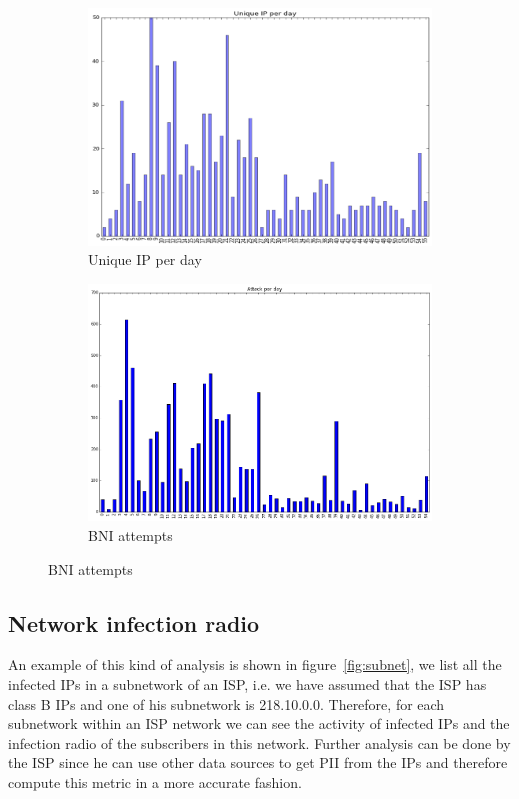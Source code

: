 \begin{figure}[ht]
    \begin{subfigure}[ht]{0.5\linewidth}
        \caption{Unique IP per day}
        \label{fig:bnia_att_d}
        \centering
        \includegraphics[width=\textwidth]{images/uni_ip_day}
    \end{subfigure}
\quad
    \begin{subfigure}[ht]{0.5\textwidth}
        \caption{BNI attempts}
        \label{fig:bnia_att_i}
        \centering
        \includegraphics[width=\linewidth]{images/att_day}
    \end{subfigure}

\end{figure}


\subsection{Network infection radio}
An example of this kind of analysis is shown in figure~\ref{fig:subnet}, we list all the infected IPs in a subnetwork of an ISP, i.e. we have assumed that the ISP has class B IPs and one of his subnetwork is 218.10.0.0. Therefore, for each subnetwork within an ISP network we can see the activity of infected IPs and the infection radio of the subscribers in this network. Further analysis can be done by the ISP since he can use other data sources to get PII from the IPs and therefore compute this metric in a more accurate fashion.


